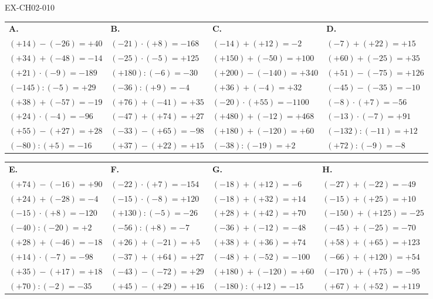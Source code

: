 \begin{solution}{EX-CH02-010}

\def\arraystretch{1.7}
\begin{tabularx}{\linewidth}{*{4}{X}}
\textbf{A.} & \textbf{B.} & \textbf{C.} & \textbf{D.} \\
$(+14)-(-26)=+40$ & $(-21)\cdot(+8)=-168$ & $(-14)+(+12)=-2$ & $(-7)+(+22)=+15$ \\
$(+34)+(-48)=-14$ & $(-25)\cdot(-5)=+125$ & $(+150)+(-50)=+100$ & $(+60)+(-25)=+35$ \\
$(+21)\cdot(-9)=-189$ & $(+180):(-6)=-30$ & $(+200)-(-140)=+340$ & $(+51)-(-75)=+126$ \\
$(-145):(-5)=+29$ & $(-36):(+9)=-4$ & $(+36)+(-4)=+32$ & $(-45)-(-35)=-10$ \\
$(+38)+(-57)=-19$ & $(+76)+(-41)=+35$ & $(-20)\cdot(+55)=-1100$ & $(-8)\cdot(+7)=-56$ \\
$(+24)\cdot(-4)=-96$ & $(-47)+(+74)=+27$ & $(+480)+(-12)=+468$ & $(-13)\cdot(-7)=+91$ \\
$(+55)-(+27)=+28$ & $(-33)-(+65)=-98$ & $(+180)+(-120)=+60$ & $(-132):(-11)=+12$ \\
$(-80):(+5)=-16$ & $(+37)-(+22)=+15$ & $(-38):(-19)=+2$ & $(+72):(-9)=-8$ \\
\end{tabularx}

\bigskip
\begin{tabularx}{\linewidth}{*{4}{X}}
\textbf{E.} & \textbf{F.} & \textbf{G.} & \textbf{H.} \\
$(+74)-(-16)=+90$ & $(-22)\cdot(+7)=-154$ & $(-18)+(+12)=-6$ & $(-27)+(-22)=-49$ \\
$(+24)+(-28)=-4$ & $(-15)\cdot(-8)=+120$ & $(-18)+(+32)=+14$ & $(-15)+(+25)=+10$ \\
$(-15)\cdot(+8)=-120$ & $(+130):(-5)=-26$ & $(+28)+(+42)=+70$ & $(-150)+(+125)=-25$ \\
$(-40):(-20)=+2$ & $(-56):(+8)=-7$ & $(-36)+(-12)=-48$ & $(-45)+(-25)=-70$ \\
$(+28)+(-46)=-18$ & $(+26)+(-21)=+5$ & $(+38)+(+36)=+74$ & $(+58)+(+65)=+123$ \\
$(+14)\cdot(-7)=-98$ & $(-37)+(+64)=+27$ & $(-48)+(-52)=-100$ & $(-66)+(+120)=+54$ \\
$(+35)-(+17)=+18$ & $(-43)-(-72)=+29$ & $(+180)+(-120)=+60$ & $(-170)+(+75)=-95$ \\
$(+70):(-2)=-35$ & $(+45)-(+29)=+16$ & $(-180):(+12)=-15$ & $(+67)+(+52)=+119$ \\
\end{tabularx}


\end{solution}
